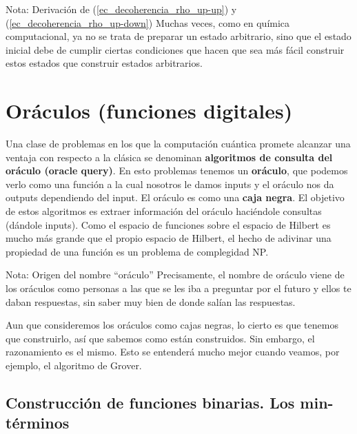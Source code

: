 \documentclass[a4paper,11pt]{book} %
\numberwithin{equation}{chapter}
\begin{document}
\begin{mybox_blue}{Nota: Derivación de (\ref{ec_decoherencia_rho_up-up}) y  (\ref{ec_decoherencia_rho_up-down})}
Muchas veces, como en química computacional, ya no se trata de preparar un estado arbitrario, sino que el estado inicial debe de cumplir ciertas condiciones que hacen que sea más fácil construir estos estados que construir estados arbitrarios.

    
    
    \section{Oráculos (funciones digitales)}

Una clase de problemas en los que la computación cuántica promete alcanzar una ventaja con respecto a la clásica se denominan \textbf{algoritmos de consulta del oráculo (oracle query)}. En esto problemas tenemos un \textbf{oráculo}, que podemos verlo como una función a la cual nosotros le damos inputs y el oráculo nos da outputs dependiendo del input. El oráculo es como una \textbf{caja negra}. El objetivo de estos algoritmos es extraer información del oráculo haciéndole consultas (dándole inputs). Como el espacio de funciones sobre el espacio de Hilbert es mucho más grande que el propio espacio de Hilbert, el hecho de adivinar una propiedad de una función es un problema de complegidad NP.

	\begin{mybox_blue}{Nota: Origen del nombre ``oráculo''}
	Precisamente, el nombre de oráculo viene de los oráculos como personas a las que se les iba a preguntar
	por el futuro y ellos te daban respuestas, sin saber muy bien de donde salían las respuestas.
	\end{mybox_blue}

Aun que consideremos los oráculos como cajas negras, lo cierto es que tenemos que construirlo, así que sabemos como están construidos. Sin embargo, el razonamiento es el mismo. Esto se entenderá mucho mejor cuando veamos, por ejemplo, el algoritmo de Grover.


    	\subsection{Construcción de funciones binarias. Los min-términos}


\end{mybox_blue}
\end{document}
